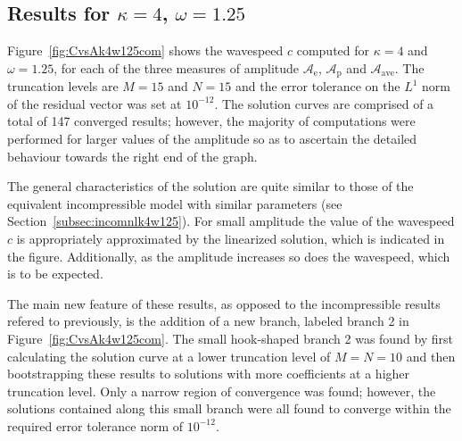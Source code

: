 \subsection[Results for $\kappa=4$, $\omega=1.25$]{Results for \boldmath$\kappa=4$, $\omega=1.25$}
Figure~\ref{fig:CvsAk4w125com} shows the wavespeed $c$ computed for $\kappa=4$ and $\omega=1.25$, for each of the three measures of amplitude $\mathcal{A}_{\text{e}}$, $\mathcal{A}_{\text{p}}$ and $\mathcal{A}_{\text{ave}}$. The truncation levels are $M=15$ and $N=15$ and the error tolerance on the $L^1$ norm of the residual vector was set at $10^{-12}$. The solution curves are comprised of a total of 147 converged results; however, the majority of computations were performed for larger values of the amplitude so as to ascertain the detailed behaviour towards the right end of the graph.

The general characteristics of the solution are quite similar to those of the equivalent incompressible model with similar parameters (see Section~\ref{subsec:incomnlk4w125}). For small amplitude the value of the wavespeed $c$ is appropriately approximated by the linearized solution, which is indicated in the figure. Additionally, as the amplitude increases so does the wavespeed, which is to be expected. 

The main new feature of these results, as opposed to the incompressible results refered to previously, is the addition of a new branch, labeled branch 2 in Figure~\ref{fig:CvsAk4w125com}. The small hook-shaped branch 2 was found by first calculating the solution curve at a lower truncation level of $M=N=10$ and then bootstrapping these results to solutions with more coefficients at a higher truncation level. Only a narrow region of convergence was found; however, the solutions contained along this small branch were all found to converge within the required error tolerance norm of $10^{-12}$. 

